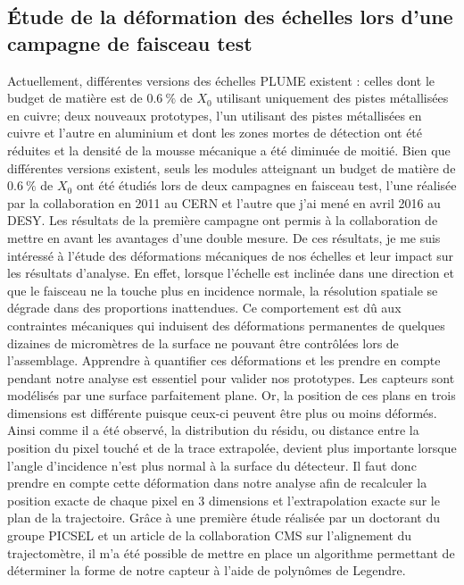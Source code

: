     \subsection{Étude de la déformation des échelles lors d'une campagne de faisceau test}

  Actuellement, différentes versions des échelles PLUME existent : celles dont le budget de matière est de $0.6~\%$ de $X_0$ utilisant uniquement des pistes métallisées en cuivre; deux nouveaux prototypes, l'un utilisant des pistes métallisées en cuivre et l'autre en aluminium et dont les zones mortes de détection ont été réduites et la densité de la mousse mécanique a été diminuée de moitié.
  Bien que différentes versions existent, seuls les modules atteignant un budget de matière de $0.6~\%$ de $X_0$ ont été étudiés lors de deux campagnes en faisceau test, l'une réalisée par la collaboration en 2011 au CERN et l'autre que j'ai mené en avril 2016 au DESY.
  Les résultats de la première campagne ont permis à la collaboration de mettre en avant les avantages d'une double mesure. 
  De ces résultats, je me suis intéressé à l'étude des déformations mécaniques de nos échelles et leur impact sur les résultats d'analyse.
  En effet, lorsque l'échelle est inclinée dans une direction et que le faisceau ne la touche plus en incidence normale, la résolution spatiale se dégrade dans des proportions inattendues.
  Ce comportement est dû aux contraintes mécaniques qui induisent des déformations permanentes de quelques dizaines de micromètres de la surface ne pouvant être contrôlées lors de l'assemblage.
  Apprendre à quantifier ces déformations et les prendre en compte pendant notre analyse est essentiel pour valider nos prototypes.
  Les capteurs sont modélisés par une surface parfaitement plane.
  Or, la position de ces plans en trois dimensions est différente puisque ceux-ci peuvent être plus ou moins déformés.
  Ainsi comme il a été observé, la distribution du résidu, ou distance entre la position du pixel touché et de la trace extrapolée, devient plus importante lorsque l'angle d'incidence n'est plus normal à la surface du détecteur.
  Il faut donc prendre en compte cette déformation dans notre analyse afin de recalculer la position exacte de chaque pixel en 3 dimensions et l'extrapolation exacte sur le plan de la trajectoire. 
  Grâce à une première étude réalisée par un doctorant du groupe PICSEL et un article de la collaboration CMS sur l'alignement du trajectomètre\cite{CMSalignment}, il m'a été possible de mettre en place un algorithme permettant de déterminer la forme de notre capteur à l'aide de polynômes de Legendre. 
